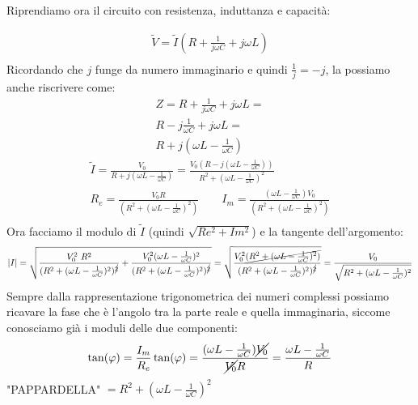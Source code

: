 \documentclass[a4paper, oneside]{article}
\begin{document}
Riprendiamo ora il circuito con resistenza, induttanza e capacità:
\begin{center}
\end{center}
\begin{gather*}
    \tilde{V} = \tilde{I} (R + \frac{1}{j \omega C} + j\omega L)\\
\end{gather*}
Ricordando che $j$ funge da numero immaginario e quindi $\frac{1}{j} = -j$, la possiamo anche riscrivere come:
\begin{gather*}
    Z = R + \frac{1}{j \omega C} + j\omega L = \\
    R  - j\frac{1}{\omega C} + j\omega L = \\
    R + j (\omega L - \frac{1}{\omega C})
\end{gather*}
\begin{gather*}
    \tilde{I} = \frac{V_0}{R + j (\omega L - \frac{1}{\omega C})} = \frac{V_0(R - j(\omega L - \frac{1}{\omega C}))}{R^2 + (\omega L - \frac{1}{\omega C})^2}\\
    R_e = \frac{V_0 R}{(R^2 + (\omega L - \frac{1}{\omega C})^2)} \qquad I_m = \frac{(\omega L -\frac{1}{\omega C}) V_0}{(R^2 + (\omega L - \frac{1}{\omega C})^2)}\\
\end{gather*}
Ora facciamo il modulo di $\tilde{I}$ (quindi $\sqrt{Re^2 + Im^2}$) e la tangente dell'argomento:
\begin{gather*}
    |I| = \sqrt{\frac{V_0^2 \ R^2}{{(R^2 + (\omega L - \frac{1}{\omega C})^2)^{\cancel{2}}} } + \frac{V_0^2 (\omega L - \frac{1}{\omega C})^2}{{(R^2 + (\omega L - \frac{1}{\omega C})^2)^{\cancel{2}}} }} = \sqrt{\frac{V_0^2 \cancel{(R^2 + (\omega L - \frac{1}{\omega C})^2)}}{(R^2 + (\omega L - \frac{1}{\omega C})^2)^{\cancel{2}}}} = \frac{V_0}{\sqrt{R^2 + (\omega L - \frac{1}{\omega C})^2}}\\
\end{gather*}
Sempre dalla rappresentazione trigonometrica dei numeri complessi possiamo ricavare la fase che è l'angolo tra la parte reale e quella immaginaria, siccome conosciamo già i moduli delle due componenti:
\begin{gather*}
    \tan(\varphi) = \frac{I_m}{R_e}
    \tan(\varphi) = \frac{(\omega L - \frac{1}{\omega C}) \cancel{V_0}}{\cancel{V_0} R} = \frac{\omega L - \frac{1}{\omega C}}{R}
\end{gather*}
"PAPPARDELLA" $= R^2 + (\omega L - \frac{1}{\omega C})^2$\\
\end{document}
